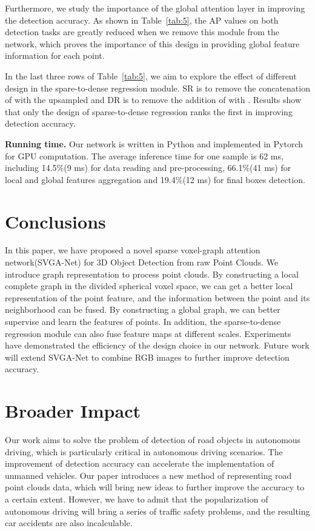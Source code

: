 \documentclass{article}
\begin{document}
Furthermore, we study the importance of the global attention layer in improving the detection accuracy. As shown in Table~\ref{tab:5}, the AP values on both detection tasks are greatly reduced when we remove this module from the network, which proves the importance of this design in providing global feature information for each point.

In the last three rows of Table~\ref{tab:5}, we aim to explore the effect of different design in the spare-to-dense regression module. SR is to remove the concatenation of  with the upsampled  and DR is to remove the addition of  with . Results show that only the design of sparse-to-dense regression ranks the first in improving detection accuracy.

\textbf{Running time.} Our network is written in Python and implemented in Pytorch for GPU computation. The average inference time for one sample is 62 ms, including 14.5\%(9 ms) for data reading and pre-processing, 66.1\%(41 ms) for local and global features aggregation and 19.4\%(12 ms) for final boxes detection.
\section{Conclusions}
In this paper, we have proposed a novel sparse voxel-graph attention network(SVGA-Net) for 3D Object Detection from raw Point Clouds. We introduce graph representation to process point clouds. By constructing a local complete graph in the divided spherical voxel space, we can get a better local representation of the point feature, and the information between the point and its neighborhood can be fused. By constructing a global graph, we can better supervise and learn the features of points. In addition, the sparse-to-dense regression module can also fuse feature maps at different scales. Experiments have demonstrated the efficiency of the design choice in our network. Future work will extend SVGA-Net to combine RGB images to further improve detection accuracy.
\section*{Broader Impact}
Our work aims to solve the problem of detection of road objects in autonomous driving, which is particularly critical in autonomous driving scenarios. The improvement of detection accuracy can accelerate the implementation of unmanned vehicles. Our paper introduces a new method of representing road point clouds data, which will bring new ideas to further improve the accuracy to a certain extent. However, we have to admit that the popularization of autonomous driving will bring a series of traffic safety problems, and the resulting car accidents are also incalculable.
\end{document}
